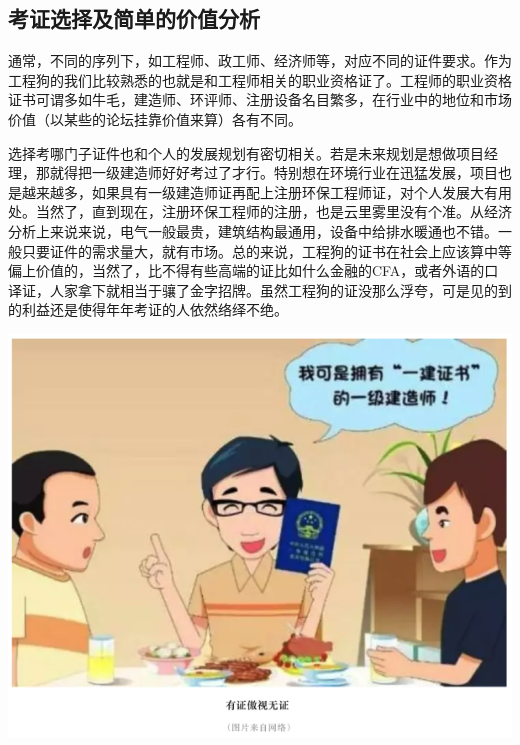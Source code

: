 \documentclass[
]{book}
\begin{document}
\hypertarget{ux8003ux8bc1ux9009ux62e9ux53caux7b80ux5355ux7684ux4ef7ux503cux5206ux6790}{%
\subsection{考证选择及简单的价值分析}\label{ux8003ux8bc1ux9009ux62e9ux53caux7b80ux5355ux7684ux4ef7ux503cux5206ux6790}}

通常，不同的序列下，如工程师、政工师、经济师等，对应不同的证件要求。作为工程狗的我们比较熟悉的也就是和工程师相关的职业资格证了。工程师的职业资格证书可谓多如牛毛，建造师、环评师、注册设备名目繁多，在行业中的地位和市场价值（以某些的论坛挂靠价值来算）各有不同。

选择考哪门子证件也和个人的发展规划有密切相关。若是未来规划是想做项目经理，那就得把一级建造师好好考过了才行。特别想在环境行业在迅猛发展，项目也是越来越多，如果具有一级建造师证再配上注册环保工程师证，对个人发展大有用处。当然了，直到现在，注册环保工程师的注册，也是云里雾里没有个准。从经济分析上来说来说，电气一般最贵，建筑结构最通用，设备中给排水暖通也不错。一般只要证件的需求量大，就有市场。总的来说，工程狗的证书在社会上应该算中等偏上价值的，当然了，比不得有些高端的证比如什么金融的CFA，或者外语的口译证，人家拿下就相当于骧了金字招牌。虽然工程狗的证没那么浮夸，可是见的到的利益还是使得年年考证的人依然络绎不绝。

\includegraphics[width=8.33in]{images/kaozheng2}
\end{document}
